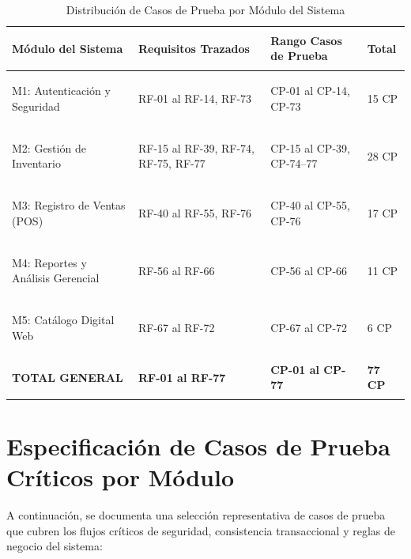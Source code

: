 \begin{table}[H]
\centering
\small
\begin{tabularx}{\textwidth}{>{\bfseries\raggedright}p{4.2cm} >{\centering}p{4.2cm} >{\centering}p{3.4cm} Z}
\toprule
\textbf{Módulo del Sistema} & \textbf{Requisitos Trazados} & \textbf{Rango Casos de Prueba} & \textbf{Total} \\
\midrule
M1: Autenticación y Seguridad & RF-01 al RF-14, RF-73 & CP-01 al CP-14, CP-73 & 15 CP \\
\addlinespace
M2: Gestión de Inventario & RF-15 al RF-39, RF-74, RF-75, RF-77 & CP-15 al CP-39, CP-74--77 & 28 CP \\
\addlinespace
M3: Registro de Ventas (POS) & RF-40 al RF-55, RF-76 & CP-40 al CP-55, CP-76 & 17 CP \\
\addlinespace
M4: Reportes y Análisis Gerencial & RF-56 al RF-66 & CP-56 al CP-66 & 11 CP \\
\addlinespace
M5: Catálogo Digital Web & RF-67 al RF-72 & CP-67 al CP-72 & 6 CP \\
\midrule
\textbf{TOTAL GENERAL} & \textbf{RF-01 al RF-77} & \textbf{CP-01 al CP-77} & \textbf{77 CP} \\
\bottomrule
\end{tabularx}
\caption{Distribución de Casos de Prueba por Módulo del Sistema}
\label{tab:distribucion_cp}
\end{table}

\section{Especificación de Casos de Prueba Críticos por Módulo}
A continuación, se documenta una selección representativa de casos de prueba que cubren los flujos críticos de seguridad, consistencia transaccional y reglas de negocio del sistema:

